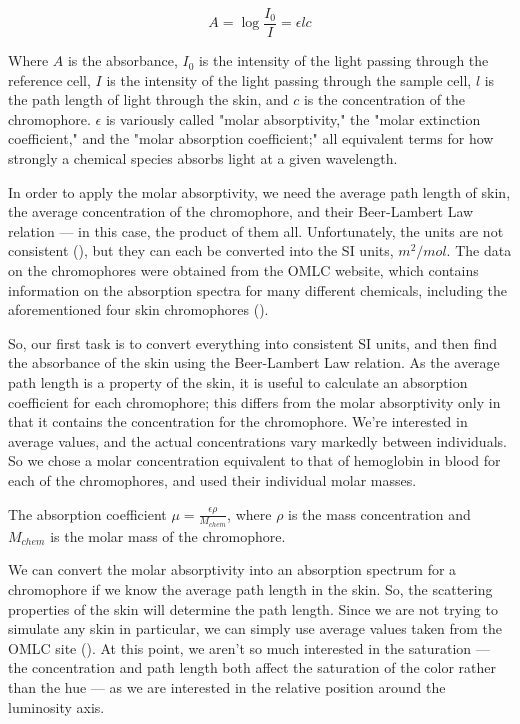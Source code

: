 \begin{equation}\label{eq:BeerLambert}
A = \log \frac{I_{0}}{I} = \epsilon l  c 
\end{equation}

Where $A$ is the absorbance, $I_{0}$ is the intensity of the light passing through the reference cell, $I$ is the intensity of the light passing through the sample cell, $l$ is the path length of light through the skin, and $c$ is the concentration of the chromophore. $\epsilon$ is variously called "molar absorptivity," the "molar extinction coefficient," and the "molar absorption coefficient;" all equivalent terms for how strongly a chemical species absorbs light at a given wavelength.

In order to apply the molar absorptivity, we need the average path length of skin, the average concentration of the chromophore, and their Beer-Lambert Law relation --- in this case, the product of them all. Unfortunately, the units are not consistent (\cite{Clark2007}), but they can each be converted into the SI units, $m^{2}/mol$. The data on the chromophores were obtained from the OMLC website, which contains information on the absorption spectra for many different chemicals, including the aforementioned four skin chromophores (\cite{OMLC2001}). 

So, our first task is to convert everything into consistent SI units, and then find the absorbance of the skin using the Beer-Lambert Law relation. As the average path length is a property of the skin, it is useful to calculate an absorption coefficient for each chromophore; this differs from the molar absorptivity only in that it contains the concentration for the chromophore. We're interested in average values, and the actual concentrations vary markedly between individuals. So we chose a molar concentration equivalent to that of hemoglobin in blood for each of the chromophores, and used their individual molar masses.

The absorption coefficient $\mu = \frac{\epsilon \rho}{M_{chem}}$, where $\rho$ is the mass concentration and $M_{chem}$ is the molar mass of the chromophore.

We can convert the molar absorptivity into an absorption spectrum for a chromophore if we know the average path length in the skin. So, the scattering properties of the skin will determine the path length. Since we are not trying to simulate any skin in particular, we can simply use average values taken from the OMLC site (\cite{OMLC2001}). At this point, we aren't so much interested in the saturation --- the concentration and path length both affect the saturation of the color rather than the hue --- as we are interested in the relative position around the luminosity axis.

